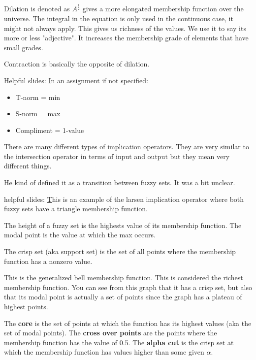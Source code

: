 \documentclass{article}
\begin{document}
Dilation is denoted as $A^{\frac{1}{2}}$  gives a more elongated membership function over the universe. The integral in the equation is only used in the continuous case, it might not always apply. This gives us richness of the values. We use it to say its more or less "adjective". It increases the membership grade of elements that have small grades.

Contraction is basically the opposite of dilation.

Helpful slides: \href{http://web.cecs.pdx.edu/~mperkows/CLASS_479/LECTURES479/FL001.PDF}



In an assignment if not specified:
\begin{itemize}
	\item T-norm = min
	\item S-norm = max
	\item Compliment = 1-value
\end{itemize}


There are many different types of implication operators. They are very similar to the intersection operator in terms of input and output but they mean very different things.

He kind of defined it as a transition between fuzzy sets. It was a bit unclear.


helpful slides: \href{http://www.intelligent-systems.info/classes/ee509/8.pdf}


This is an example of the larsen implication operator where both fuzzy sets have a triangle membership function.




The height of a fuzzy set is the highests value of its membership function. The modal point is the value at which the max occurs.



The crisp set (aka support set) is the set of all points where the membership function has a nonzero value.


This is the generalized bell membership function. This is considered the richest membership function. You can see from this graph that it has a crisp set, but also that its modal point is actually a set of points since the graph has a plateau of highest points.

The \textbf{core} is the set of points at which the function has its highest values (aka the set of modal points). The \textbf{cross over points} are the points where the membership function has the value of 0.5. The \textbf{alpha cut} is the crisp set at which the membership function has values higher than some given $\alpha$.
\end{document}
